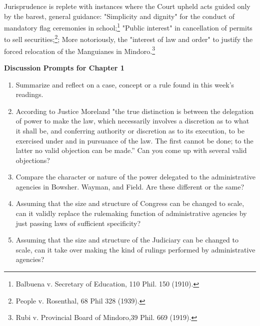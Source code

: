 \documentclass[../main.tex]{subfiles}
\begin{document}
Jurisprudence is replete with instances where the Court upheld acts guided only by the barest, general guidance: "Simplicity and dignity" for the conduct of mandatory flag ceremonies in school;\footnote{Balbuena v. Secretary of Education, 110 Phil. 150 (1910).} "Public interest" in cancellation of permits to sell securities;\footnote{People v. Rosenthal, 68 Phil 328 (1939).}; More notoriously, the "interest of law and order" to justify the forced relocation of the Manguianes in Mindoro.\footnote{Rubi v. Provincial Board of Mindoro,39 Phil. 669 (1919).}
\newpage
\begin{shaded}
\textbf{Discussion Prompts for Chapter 1}
\begin{enumerate}
    \item Summarize and reflect on a case, concept or a rule found in this week’s readings. 
    \item According to Justice Moreland "the true distinction is between the delegation of power to make the law, which necessarily involves a discretion as to what it shall be, and conferring authority or discretion as to its execution, to be exercised under and in pursuance of the law. The first cannot be done; to the latter no valid objection can be made.” Can you come up with several valid objections?
    \item Compare the character or nature of the power delegated to the administrative agencies in Bowsher. Wayman, and Field. Are these different or the same?
    \item Assuming that the size and structure of Congress can be changed to scale, can it validly replace the rulemaking function of administrative agencies by just passing laws of sufficient specificity?
    \item Assuming that the size and structure of the Judiciary can be changed to scale, can it take over making the kind of rulings performed by administrative agencies?
\end{enumerate}


\end{shaded}
\end{document}
